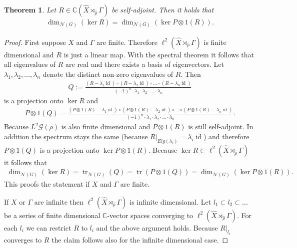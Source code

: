 \documentclass[12pt,a4paper]{scrartcl}
\theoremstyle{plain}
\newtheorem{Theorem}{Theorem}[subsection]
\theoremstyle{definition}
\newcommand{\C}{\mathbb{C}} %
\newcommand{\2}{\mathbb{Z} / 2 \mathbb{Z}}
\newcommand{\G}{\mathcal{G}}
\newcommand{\1}{\bar{1}}
\newcommand{\0}{\bar{0}}
\newcommand{\tr}{\operatorname{tr}}
\newcommand{\id}{\operatorname{id}}
\begin{document}
\begin{Theorem} \label{pontr_vNd}
	Let $R \in \C(\hat{X} \rtimes_{\hat{\rho}} \Gamma)$ be self-adjoint. Then it holds that
	\begin{align*}
		\dim_{\mathcal{N}(G)}(\ker R) = \dim_{\mathcal{N}(G)}(\ker P \otimes 1(R)).
	\end{align*}
\end{Theorem} 
\begin{proof}
	First suppose $X$ and $\Gamma$ are finite. Therefore $\ell^2(\hat{X} \rtimes_{\hat{\rho}} \Gamma)$ is finite dimensional and $R$ is just a linear map. With the spectral theorem it follows that all eigenvalues of $R$ are real and there exists a basis of eigenvectors. Let $\lambda_1, \lambda_2, \ldots, \lambda_n$ denote the distinct non-zero eigenvalues of $R$. Then
	\begin{align*}
		Q := \frac{(R - \lambda_1 \id) \circ (R - \lambda_2 \id) \circ \ldots \circ (R - \lambda_n \id)}{(-1)^n \cdot \lambda_1 \cdot \lambda_2 \cdot \ldots \cdot \lambda_n}
	\end{align*}
	is a projection onto $\ker R$ and 
	\begin{align*}
		P \otimes 1 (Q) = \frac{(P \otimes 1(R) - \lambda_1 \id) \circ (P \otimes 1(R) - \lambda_2 \id) \circ \ldots \circ (P \otimes 1(R) - \lambda_n \id)}{(-1)^n \cdot \lambda_1 \cdot \lambda_2 \cdot \ldots \cdot \lambda_n}.
	\end{align*}
	Because $L^2 \G (\rho)$ is also finite dimensional and $P \otimes 1(R)$ is still self-adjoint. In addition the spectrum stays the same (because $R|_{Eig(\lambda_i)} = \lambda_i \id$) and therefore $P \otimes 1 (Q)$ is a projection onto $\ker P \otimes 1 (R)$. Because $\ker R \subset \ell^2(\hat{X} \rtimes_{\hat{\rho}} \Gamma) $ it follows that
	\begin{align*}
		\dim_{\mathcal{N}(G)}(\ker R) = \tr_{\mathcal{N}(G)}(Q) = \tr(P \otimes 1 (Q)) = \dim_{\mathcal{N}(G)}(\ker P \otimes 1 (R)).
	\end{align*}
	This proofs the statement if $X$ and $\Gamma$ are finite.
	
	If $X$ or $\Gamma$ are infinite then $\ell^2(\hat{X} \rtimes_{\hat{\rho}} \Gamma)$ is infinite dimensional. Let $l_1 \subset l_2 \subset \ldots$ be a series of finite dimensional $\C$-vector spaces converging to $\ell^2(\hat{X} \rtimes_{\hat{\rho}} \Gamma)$. For each $l_i$ we can restrict $R$ to $l_i$ and the above argument holds. Because $R|_{l_i}$ converges to $R$ the claim follows also for the infinite dimensional case.
\end{proof}
\end{document}
